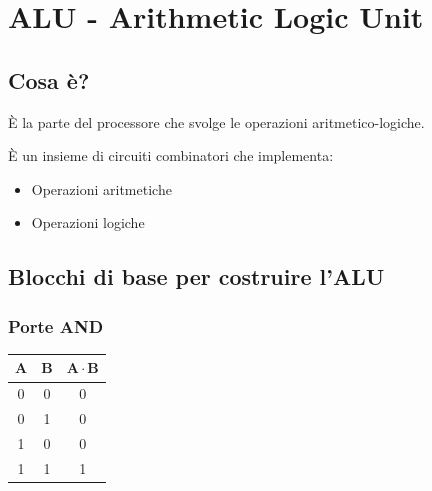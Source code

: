 \chapter{ALU - Arithmetic Logic Unit}
\section{Cosa è?}
È la parte del processore che svolge le operazioni aritmetico-logiche.

È un insieme di circuiti combinatori che implementa:
\begin{itemize}
    \item Operazioni aritmetiche
    \item Operazioni logiche
\end{itemize}

\section{Blocchi di base per costruire l'ALU}

\subsection{Porte AND}
\begin{minipage}[c]{0.45\textwidth}
\end{minipage}
\hfil
\begin{minipage}[c]{0.45\textwidth}
    \begin{tabular}{|c|c|c|}
        \hline
        $\mathbf{A}$ & $\mathbf{B}$ & $\mathbf{A \cdot B}$ \\ \hline
        0   &   0   &   0 \\ \hline
        0   &   1   &   0 \\ \hline
        1   &   0   &   0 \\ \hline
        1   &   1   &   1 \\ \hline
    \end{tabular}
\end{minipage}

